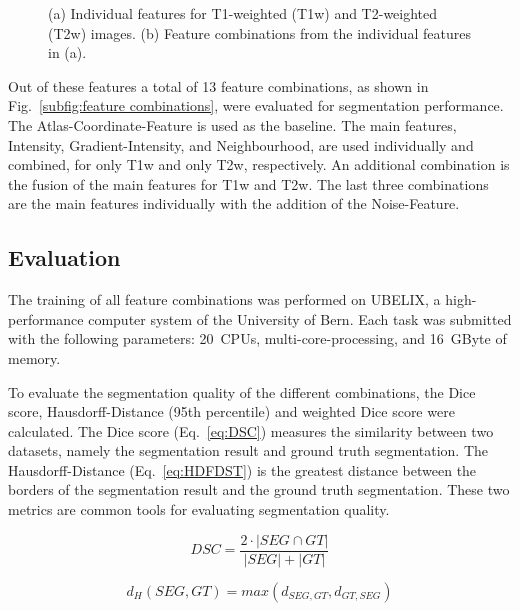 \documentclass[conference]{IEEEtran}
\begin{document}
\begin{figure}[h!]
    \centering
    \hfill
    \caption{(a) Individual features for T1-weighted (T1w) and T2-weighted (T2w) images. (b) Feature combinations from the individual features in (a).}
    \label{fig:Features and Feature Combinations}
\end{figure}

Out of these features a total of 13 feature combinations, as shown in Fig.~\ref{subfig:feature combinations}, were evaluated for segmentation performance. The Atlas-Coordinate-Feature is used as the baseline. The main features, Intensity, Gradient-Intensity, and Neighbourhood, are used individually and combined, for only T1w and only T2w, respectively. An additional combination is the fusion of the main features for T1w and T2w. The last three combinations are the main features individually with the addition of the Noise-Feature.

\subsection{Evaluation} \label{subsec:Evaluation}
The training of all feature combinations was performed on UBELIX, a high-performance computer system of the University of Bern. Each task was submitted with the following parameters: 20~CPUs, multi-core-processing, and 16~GByte of memory.

To evaluate the segmentation quality of the different combinations, the Dice score, Hausdorff-Distance (95th percentile) and weighted Dice score were calculated. The Dice score (Eq.~\ref{eq:DSC}) measures the similarity between two datasets, namely the segmentation result and ground truth segmentation. The Hausdorff-Distance (Eq.~\ref{eq:HDFDST}) is the greatest distance between the borders of the segmentation result and the ground truth segmentation. These two metrics are common tools for evaluating segmentation quality.

\begin{equation} \label{eq:DSC}
    DSC = \frac{2 \cdot |SEG \cap GT|}{|SEG|+|GT|}
\end{equation}

\begin{equation} \label{eq:HDFDST}
    d_H(SEG,GT) = max(d_{SEG,GT},d_{GT,SEG})
\end{equation}
\end{document}
